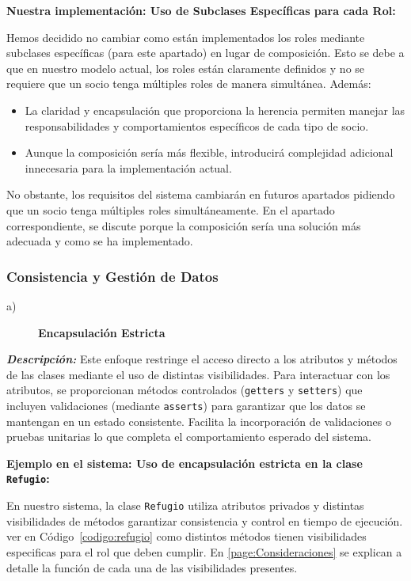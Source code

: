 \textbf{Nuestra implementación: Uso de Subclases Específicas para cada Rol:}\par  
\vspace{0.15cm}
Hemos decidido no cambiar como están implementados los roles mediante subclases específicas 
(para este apartado) en lugar de composición. Esto se debe a que en nuestro modelo actual, 
los roles están claramente definidos y no se requiere que un socio tenga múltiples roles de 
manera simultánea. Además:
\begin{itemize}
    \item La claridad y encapsulación que proporciona la herencia permiten manejar las responsabilidades y comportamientos específicos de cada tipo de socio.
    \item Aunque la composición sería más flexible, introducirá complejidad adicional innecesaria para la implementación actual.
\end{itemize}

No obstante, los requisitos del sistema cambiarán en futuros apartados pidiendo que un socio
tenga múltiples roles simultáneamente. En el apartado correspondiente, se discute porque 
la composición sería una solución más adecuada y como se ha implementado.




\subsubsection{Consistencia y Gestión de Datos}\label{page:Consistencia y Gestión de Datos}

\begin{description}
    \item[a)] \textbf{Encapsulación Estricta}
\end{description}

\textit{\textbf{Descripción:}}  
Este enfoque restringe el acceso directo a los atributos y métodos de las clases mediante 
el uso de distintas visibilidades. Para interactuar con los atributos, se proporcionan métodos 
 controlados (\texttt{getters} y \texttt{setters}) que incluyen validaciones (mediante 
\texttt{asserts}) para garantizar que los datos se mantengan en un estado consistente.
Facilita la incorporación de validaciones o pruebas unitarias lo que completa el comportamiento
esperado del sistema. 
\vspace{0.15cm}


\textbf{Ejemplo en el sistema: Uso de encapsulación estricta en la clase \texttt{Refugio}:}\par  
En nuestro sistema, la clase \texttt{Refugio} utiliza atributos privados y distintas visibilidades de métodos 
 garantizar consistencia y control en tiempo de ejecución. ver en Código~\ref{codigo:refugio} como distintos métodos tienen visibilidades especificas para el rol que deben cumplir.
 En \ref{page:Consideraciones} se explican a detalle la función de cada una de las visibilidades presentes.


